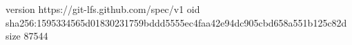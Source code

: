 version https://git-lfs.github.com/spec/v1
oid sha256:1595334565d01830231759bddd5555ec4faa42e94dc905cbd658a551b125c82d
size 87544
